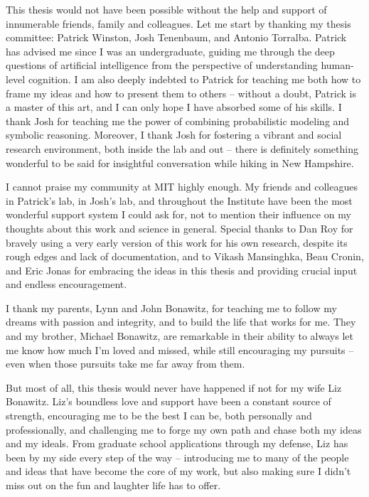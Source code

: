 This thesis would not have been possible without the help and support of innumerable friends, family
and colleagues.  Let me start by thanking my thesis committee: Patrick Winston, Josh Tenenbaum, and Antonio Torralba.
Patrick has advised me since I was an undergraduate, guiding me through the deep questions of 
artificial intelligence from the perspective of understanding human-level cognition. 
I am also deeply indebted to Patrick for teaching me both
how to frame my ideas and how to present them to others -- without a doubt, Patrick is a master
of this art, and I can only hope I have absorbed some of his skills.  I thank Josh for teaching
me the power of combining probabilistic modeling and symbolic reasoning.
Moreover, I thank Josh for fostering a vibrant and social research environment, both 
inside the lab and out -- there is definitely something wonderful to be said for insightful
conversation while hiking in New Hampshire.  

I cannot praise my community at MIT highly enough.  My friends and colleagues in Patrick's lab,
in Josh's lab, and throughout the Institute have been the most wonderful support system I could 
ask for, not to mention their influence on my thoughts about this work and science in general.
Special thanks to Dan Roy for bravely using a very early version of this work for his own research,
despite its rough edges and lack of documentation, and to Vikash Mansinghka, Beau Cronin, and Eric
Jonas for embracing the ideas in this thesis and providing crucial input and endless encouragement.  

I thank my parents, Lynn and John Bonawitz, for teaching me to follow my dreams with passion
and integrity, and to build the life that works for me.  They and my brother, Michael Bonawitz,
are remarkable in their ability to
always let me know how much I'm loved and missed, while still encouraging my pursuits -- even when those pursuits
take me far away from them.

But most of all, this thesis would never have happened if not for my wife Liz Bonawitz.  Liz's
boundless love and support have been a constant source of strength, encouraging me to be the best
I can be, both personally and professionally, and challenging me to forge my own path and chase both
my ideas and my ideals.  From graduate school
applications through my defense, Liz has been by my side every step of the way -- introducing me to
many of the people and ideas that have become the core of my work, but also making sure I didn't miss
out on the fun and laughter life has to offer. 

